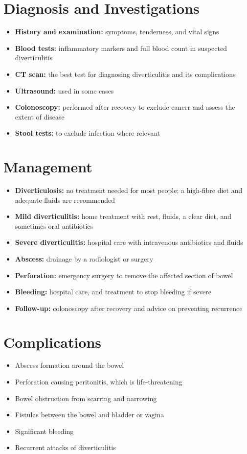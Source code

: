 \section*{Diagnosis and Investigations}
\begin{itemize}
    \item \textbf{History and examination:} symptoms, tenderness, and vital signs
    \item \textbf{Blood tests:} inflammatory markers and full blood count in suspected diverticulitis
    \item \textbf{CT scan:} the best test for diagnosing diverticulitis and its complications
    \item \textbf{Ultrasound:} used in some cases
    \item \textbf{Colonoscopy:} performed after recovery to exclude cancer and assess the extent of disease
    \item \textbf{Stool tests:} to exclude infection where relevant
\end{itemize}

\section*{Management}
\begin{itemize}
    \item \textbf{Diverticulosis:} no treatment needed for most people; a high-fibre diet and adequate fluids are recommended
    \item \textbf{Mild diverticulitis:} home treatment with rest, fluids, a clear diet, and sometimes oral antibiotics
    \item \textbf{Severe diverticulitis:} hospital care with intravenous antibiotics and fluids
    \item \textbf{Abscess:} drainage by a radiologist or surgery
    \item \textbf{Perforation:} emergency surgery to remove the affected section of bowel
    \item \textbf{Bleeding:} hospital care, and treatment to stop bleeding if severe
    \item \textbf{Follow-up:} colonoscopy after recovery and advice on preventing recurrence
\end{itemize}

\section*{Complications}
\begin{itemize}
    \item Abscess formation around the bowel
    \item Perforation causing peritonitis, which is life-threatening
    \item Bowel obstruction from scarring and narrowing
    \item Fistulas between the bowel and bladder or vagina
    \item Significant bleeding
    \item Recurrent attacks of diverticulitis
\end{itemize}

